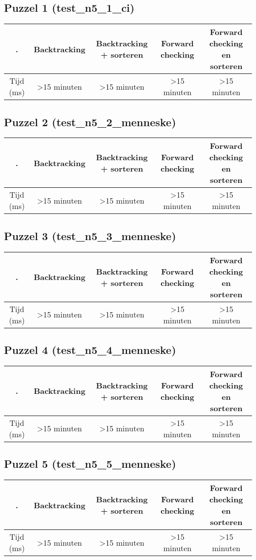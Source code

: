 \documentclass[]{report}
\begin{document}
\begin{appendices}
\subsection{Puzzel 1 (test\_n5\_1\_ci)}
\begin{tabular}{|c||c|c|c|c|}
\hline . & Backtracking & Backtracking + sorteren & Forward checking & Forward checking en sorteren \\ 
\hline \hline Tijd (ms) & \textgreater 15 minuten & \textgreater 15 minuten & \textgreater 15 minuten & \textgreater 15 minuten \\ 
\hline 
\end{tabular}
\subsection{Puzzel 2 (test\_n5\_2\_menneske)}
\begin{tabular}{|c||c|c|c|c|}
\hline . & Backtracking & Backtracking + sorteren & Forward checking & Forward checking en sorteren \\ 
\hline \hline Tijd (ms) & \textgreater 15 minuten & \textgreater 15 minuten & \textgreater 15 minuten & \textgreater 15 minuten \\ 
\hline 
\end{tabular}
\subsection{Puzzel 3 (test\_n5\_3\_menneske)}
\begin{tabular}{|c||c|c|c|c|}
\hline . & Backtracking & Backtracking + sorteren & Forward checking & Forward checking en sorteren \\ 
\hline \hline Tijd (ms) & \textgreater 15 minuten & \textgreater 15 minuten & \textgreater 15 minuten & \textgreater 15 minuten \\ 
\hline 
\end{tabular}
\subsection{Puzzel 4 (test\_n5\_4\_menneske)}
\begin{tabular}{|c||c|c|c|c|}
\hline . & Backtracking & Backtracking + sorteren & Forward checking & Forward checking en sorteren \\ 
\hline \hline Tijd (ms) & \textgreater 15 minuten & \textgreater 15 minuten & \textgreater 15 minuten & \textgreater 15 minuten \\ 
\hline 
\end{tabular}
\subsection{Puzzel 5 (test\_n5\_5\_menneske)}
\begin{tabular}{|c||c|c|c|c|}
\hline . & Backtracking & Backtracking + sorteren & Forward checking & Forward checking en sorteren \\ 
\hline \hline Tijd (ms) & \textgreater 15 minuten & \textgreater 15 minuten & \textgreater 15 minuten & \textgreater 15 minuten \\ 
\hline 
\end{tabular}

\end{appendices}
\end{document}
